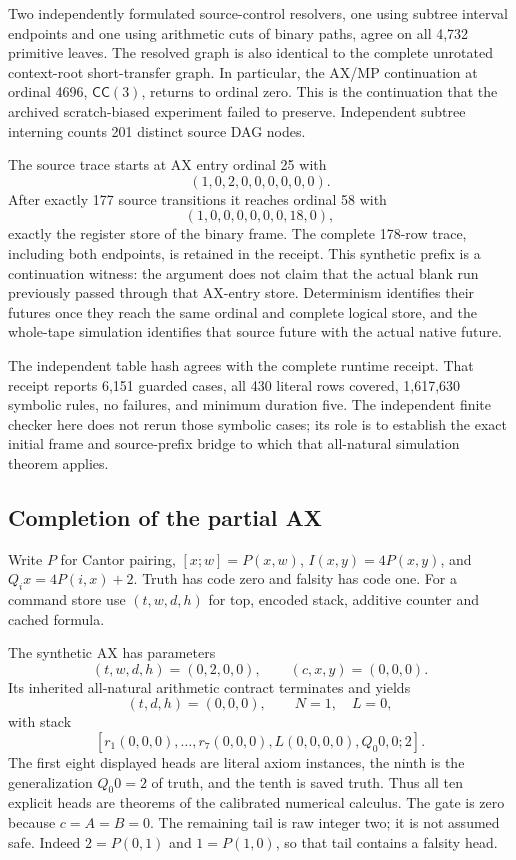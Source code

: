 Two independently formulated source-control resolvers, one using subtree
interval endpoints and one using arithmetic cuts of binary paths, agree
on all 4,732 primitive leaves.  The resolved graph is also identical to
the complete unrotated context-root short-transfer graph.  In particular,
the AX/MP continuation at ordinal 4696, $\mathsf{CC}(3)$, returns to
ordinal zero.  This is the continuation that the archived scratch-biased
experiment failed to preserve.  Independent subtree interning counts
201 distinct source DAG nodes.

The source trace starts at AX entry ordinal 25 with
\[
                      (1,0,2,0,0,0,0,0,0).
\]
After exactly 177 source transitions it reaches ordinal 58 with
\[
                      (1,0,0,0,0,0,0,18,0),
\]
exactly the register store of the binary frame.  The complete 178-row
trace, including both endpoints, is retained in the receipt.  This
synthetic prefix is a continuation witness: the argument does not claim
that the actual blank run previously passed through that AX-entry store.
Determinism identifies their futures once they reach the same ordinal
and complete logical store, and the whole-tape simulation identifies
that source future with the actual native future.

The independent table hash agrees with the complete runtime receipt.
That receipt reports 6,151 guarded cases, all 430 literal rows covered,
1,617,630 symbolic rules, no failures, and minimum duration five.  The
independent finite checker here does not rerun those symbolic cases;
its role is to establish the exact initial frame and source-prefix bridge
to which that all-natural simulation theorem applies.

\subsection{Completion of the partial AX}

Write $P$ for Cantor pairing, $[x;w]=P(x,w)$,
$I(x,y)=4P(x,y)$, and $Q_i x=4P(i,x)+2$.  Truth has code zero and
falsity has code one.  For a command store use $(t,w,d,h)$ for top,
encoded stack, additive counter and cached formula.

The synthetic AX has parameters
\[
       (t,w,d,h)=(0,2,0,0),\qquad (c,x,y)=(0,0,0).
\]
Its inherited all-natural arithmetic contract terminates and yields
\[
  (t,d,h)=(0,0,0),\qquad N=1,\quad L=0,
\]
with stack
\[
 [r_1(0,0,0),\ldots,r_7(0,0,0),
   L(0,0,0,0),Q_0 0,0;2].
\]
The first eight displayed heads are literal axiom instances, the ninth
is the generalization $Q_0 0=2$ of truth, and the tenth is saved truth.
Thus all ten explicit heads are theorems of the calibrated numerical
calculus.  The gate is zero because $c=A=B=0$.  The remaining tail is
raw integer two; it is not assumed safe.  Indeed
$2=P(0,1)$ and $1=P(1,0)$, so that tail contains a falsity head.

